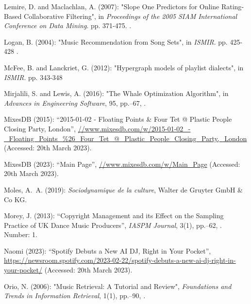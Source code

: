 \documentclass[11pt,titlepage,oneside]{book}
\begin{document}
\begin{thebibliography}{97}
	Lemire, D. and Maclachlan, A. (2007): "Slope {One} {Predictors} for
		{Online} {Rating}-{Based} {Collaborative} {Filtering}", in \textit{Proceedings
		of the 2005 SIAM International Conference on Data Mining}. pp. 371-475.
	.
	
	Logan, B. (2004): "Music {Recommendation} from {Song} {Sets}", in \textit{ISMIR}. pp. 425-428 .
	
	McFee, B. and Lanckriet, G. (2012): "Hypergraph models of playlist dialects", in \textit{ISMIR}. pp. 343-348
	
	Mirjalili, S. and Lewis, A. (2016): "The {Whale} {Optimization}
		{Algorithm}", in \textit{Advances in Engineering Software}, 95, pp.--67, .
	
	MixesDB (2015): \enquote{2015-01-02 - {Floating} {Points} \& {Four} {Tet} @
		{Plastic} {People} {Closing} {Party}, {London}},
	\urlprefix\url{//www.mixesdb.com/w/2015-01-02_-_Floating_Points_%26_Four_Tet_@_Plastic_People_Closing_Party,_London} (Accessed: 20th March 2023).
	
	MixesDB (2023): \enquote{Main {Page}},
	\urlprefix\url{//www.mixesdb.com/w/Main_Page} (Accessed: 20th March 2023).
	
	Moles, A.~A. (2019): \textit{Sociodynamique de la culture}, Walter de Gruyter GmbH \& Co KG.
	
	Morey, J. (2013): \enquote{Copyright {Management} and its {Effect} on the
		{Sampling} {Practice} of {UK} {Dance} {Music} {Producers}}, \textit{IASPM
		Journal}, 3(1), pp.--62, . Number: 1.
	
	Naomi (2023): \enquote{Spotify {Debuts} a {New} {AI} {DJ}, {Right} in {Your}
		{Pocket}},
	\urlprefix\url{https://newsroom.spotify.com/2023-02-22/spotify-debuts-a-new-ai-dj-right-in-your-pocket/} (Accessed: 20th March 2023).
	
	Orio, N. (2006): "Music {Retrieval}: {A} {Tutorial} and {Review}",
	\textit{Foundations and Trends in Information Retrieval}, 1(1),
	pp.--90, .
	

\end{thebibliography}
\end{document}
